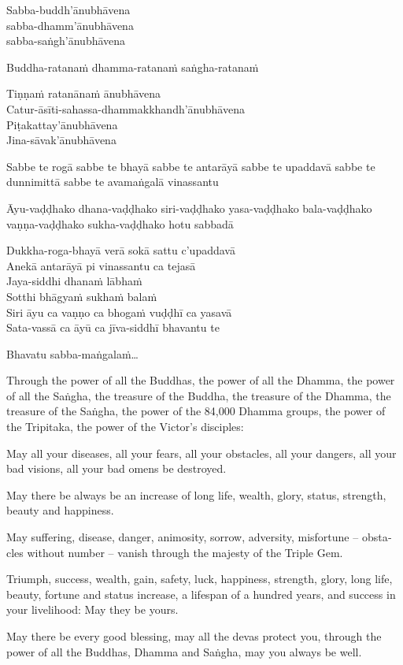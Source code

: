 
Sabba-buddh'ānubhāvena\\
sabba-dhamm'ānubhāvena\\
sabba-saṅgh'ānubhāvena

Buddha-ratanaṁ dhamma-ratanaṁ saṅgha-ratanaṁ

Tiṇṇaṁ ratanānaṁ ānubhāvena\\
Catur-āsīti-sahassa-dhammakkhandh'ānubhāvena\\
Piṭakattay'ānubhāvena\\
Jina-sāvak'ānubhāvena

Sabbe te rogā sabbe te bhayā sabbe te antarāyā sabbe te upaddavā sabbe te
dunnimittā sabbe te avamaṅgalā vinassantu

Āyu-vaḍḍhako dhana-vaḍḍhako siri-vaḍḍhako yasa-vaḍḍhako bala-vaḍḍhako
vaṇṇa-vaḍḍhako sukha-vaḍḍhako hotu sabbadā

Dukkha-roga-bhayā verā sokā sattu c'upaddavā\\
Anekā antarāyā pi vinassantu ca tejasā\\
Jaya-siddhi dhanaṁ lābhaṁ\\
Sotthi bhāgyaṁ sukhaṁ balaṁ\\
Siri āyu ca vaṇṇo ca bhogaṁ vuḍḍhī ca yasavā\\
Sata-vassā ca āyū ca jīva-siddhī bhavantu te

Bhavatu sabba-maṅgalaṁ\ldots{}

\bigskip

\begin{english}
  \setlength{\parskip}{8pt}%
  Through the power of all the Buddhas, the power of all the Dhamma, the power of all the Saṅgha,
  the treasure of the Buddha, the treasure of the Dhamma, the treasure of the Saṅgha,
  the power of the 84,000 Dhamma groups, the power of the Tripitaka, the power
  of the Victor's disciples:

  May all your diseases, all your fears, all your obstacles,
  all your dangers, all your bad visions, all your bad omens be destroyed.

  May there be always be an increase of long life, wealth, glory, status,
  strength, beauty and happiness.

  May suffering, disease, danger, animosity, sorrow, adversity, misfortune --
  obstacles without number -- vanish through the majesty of the Triple Gem.

  Triumph, success, wealth, gain, safety, luck, happiness, strength, glory, long
  life, beauty, fortune and status increase, a lifespan of a hundred years, and
  success in your livelihood: May they be yours.

  May there be every good blessing, may all the devas protect you, through the
  power of all the Buddhas, Dhamma and Saṅgha, may you always be well.
\end{english}

